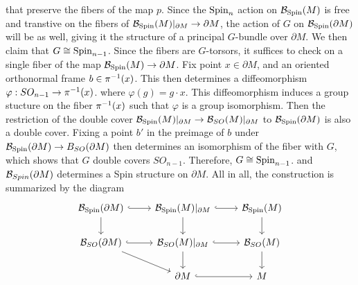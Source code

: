 that preserve the fibers of the map $p$. Since the $\mathrm{Spin}_n$ action on
$\mathcal{B}_{\mathrm{Spin}}(M)$ is free and transtive on the fibers of
$\mathcal{B}_{\mathrm{Spin}}(M)\vert_{\partial M} \to \partial M$, the action of $G$ on
$\mathcal{B}_{\mathrm{Spin}}(\partial M)$ will be as well, giving it the structure of a principal
$G$-bundle over $\partial M$. We then claim that $G \cong \mathrm{Spin}_{n-1}$. Since
the fibers are $G$-torsors, it suffices to check on a single fiber of the map
$\mathcal{B}_{\mathrm{Spin}}(M) \to \partial M$. Fix point $x \in \partial M$, and an
oriented orthonormal frame $b \in \pi^{-1}(x)$. This then determines a diffeomorphism
$\varphi : SO_{n-1} \to \pi^{-1}(x)$. where $\varphi(g) = g \cdot x$. This
diffeomorphism induces a group stucture on the fiber $\pi^{-1}(x)$ such
that $\varphi$ is a group isomorphism. Then the restriction of the double cover
$\mathcal{B}_{\mathrm{Spin}}(M)\vert_{\partial M} \to \mathcal{B}_{SO}(M)\vert_{\partial M}$ to
$\mathcal{B}_{\mathrm{Spin}}(\partial M)$ is also a double cover. Fixing a point $b'$ in the
preimage of $b$ under $\mathcal{B}_{\mathrm{Spin}}(\partial M) \to B_{SO}(\partial M)$ then
determines an isomorphism of the fiber with $G$, which shows that $G$ double
covers $SO_{n-1}$. Therefore, $G \cong \mathrm{Spin}_{n-1}$. and $\mathcal{B}_{Spin}(\partial M)$
determines a Spin structure on $\partial M$. All in all, the construction
is summarized by the diagram
\[\begin{tikzcd}
\B_{\Spin}(\partial M) \ar[d] \ar[r, hookrightarrow] & \B_{\Spin}(M)\vert_{\partial M}
\ar[r, hookrightarrow]\ar[d] & \B_{\Spin}(M) \ar[d] \\
\B_{SO}(\partial M) \ar[r, hookrightarrow] \ar[dr] &\B_{SO}(M)\vert_{\partial M}
\ar[d] \ar[r, hookrightarrow] & \B_{SO}(M) \ar[d] \\
&\partial M \ar[r, hookrightarrow] & M
\end{tikzcd}\]
%
